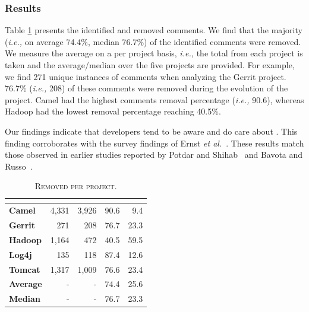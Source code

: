 

\subsubsection*{Results} Table \ref{tbl:removed_self_admitted_technical_debt_per_project} presents the identified and removed \SATD comments. We find that the majority (\textit{i.e.,} on average 74.4\%, median 76.7\%) of the identified \SATD comments were removed. We measure the average on a per project basis, \textit{i.e.,} the total from each project is taken and the average/median over the five projects are provided. For example, we find 271 unique instances of \SATD comments when analyzing the Gerrit project. 76.7\% (\textit{i.e.,} 208) of these \SATD comments were removed during the evolution of the project. Camel had the highest \SATD comments removal percentage (\textit{i.e.,} 90.6), whereas Hadoop had the lowest removal percentage reaching 40.5\%. 

Our findings indicate that developers tend to be aware and do care about \SATD. This finding corroborates with the survey findings of Ernst \emph{et al.}~\cite{Ernst2015FSE}. These results match those observed in earlier studies reported by Potdar and Shihab~\cite{Potdar2014ICSME} and Bavota and Russo~\cite{Bavota2016MSR}.

\begin{table}[!t]
	\begin{center}
		\caption{\textsc{Removed \SATD per project.}}
		\label{tbl:removed_self_admitted_technical_debt_per_project}
		\begin{tabular}{l|rrrr}
			\toprule
			\textbf{\thead{Project}} & \textbf{\thead{\#identified}} & \textbf{\thead{\#removed}} & \textbf{\thead{\% removed}} &  \textbf{\thead{\% remains}}  \\ 
			\midrule
			\textbf{Camel }  &  4,331  & 3,926  & 90.6  & 9.4\\
			\textbf{Gerrit}  &  271    & 208    & 76.7 & 23.3 \\
			\textbf{Hadoop}  &  1,164  & 472    & 40.5 & 59.5 \\  
			\textbf{Log4j }  &  135    & 118    & 87.4 & 12.6\\ 
			\textbf{Tomcat}  &  1,317  & 1,009  & 76.6 & 23.4\\   
			\midrule
			\textbf{Average} & -       & -      & 74.4 & 25.6\\
			\textbf{Median} & -       & -      & 76.7 & 23.3\\
			\bottomrule
		\end{tabular}
	\end{center}    
\end{table}

